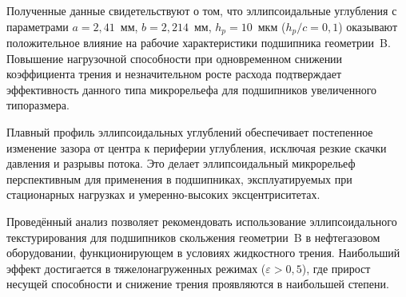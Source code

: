 Полученные данные свидетельствуют о том, что эллипсоидальные углубления с параметрами $a = 2{,}41$~мм, $b = 2{,}214$~мм, $h_p = 10$~мкм ($h_p/c = 0{,}1$) оказывают положительное влияние на рабочие характеристики подшипника геометрии~B. Повышение нагрузочной способности при одновременном снижении коэффициента трения и незначительном росте расхода подтверждает эффективность данного типа микрорельефа для подшипников увеличенного типоразмера.

Плавный профиль эллипсоидальных углублений обеспечивает постепенное изменение зазора от центра к периферии углубления, исключая резкие скачки давления и разрывы потока. Это делает эллипсоидальный микрорельеф перспективным для применения в подшипниках, эксплуатируемых при стационарных нагрузках и умеренно-высоких эксцентриситетах.

Проведённый анализ позволяет рекомендовать использование эллипсоидального текстурирования для подшипников скольжения геометрии~B в нефтегазовом оборудовании, функционирующем в условиях жидкостного трения. Наибольший эффект достигается в тяжелонагруженных режимах ($\varepsilon > 0{,}5$), где прирост несущей способности и снижение трения проявляются в наибольшей степени.

